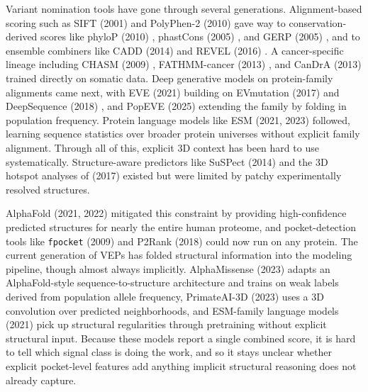 \documentclass{article}
\begin{document}
Variant nomination tools have gone through several generations. Alignment-based scoring such as SIFT (2001) \citep{ng2001sift}
and PolyPhen-2 (2010) \citep{adzhubei2010polyphen2} gave way to
conservation-derived scores like phyloP (2010) \citep{pollard2010phylop},
phastCons (2005) \citep{siepel2005phastcons}, and GERP (2005) \citep{cooper2005gerp},
and to ensemble combiners like CADD (2014) \citep{kircher2014cadd} and REVEL
(2016) \citep{ioannidis2016revel}. A cancer-specific lineage including CHASM
(2009) \citep{carter2009chasm}, FATHMM-cancer (2013) \citep{shihab2013fathmm}, and
CanDrA (2013) \citep{mao2013candra} trained directly on somatic data. Deep
generative models on protein-family alignments came next, with EVE (2021)
\citep{frazer2021eve} building on EVmutation (2017) \citep{hopf2017evmutation}
and DeepSequence (2018) \citep{riesselman2018deepsequence}, and PopEVE
(2025) \citep{orenbuch2025popeve} extending the family by folding in
population frequency. Protein language models like ESM (2021, 2023)
\citep{rives2021esm, lin2022esm2} followed, learning sequence
statistics over broader protein universes without explicit family
alignment. Through all of this, explicit 3D context has been hard to
use systematically. Structure-aware predictors like SuSPect (2014)
\citep{yates2014suspect} and the 3D hotspot analyses of
\citet{gao20173dhotspots} (2017) existed but were limited by patchy
experimentally resolved structures.

AlphaFold (2021, 2022) \citep{jumper2021alphafold, varadi2022alphafolddb} mitigated
this constraint by providing high-confidence predicted structures for
nearly the entire human proteome, and pocket-detection tools like
\texttt{fpocket} (2009) \citep{leguilloux2009fpocket} and P2Rank (2018)
\citep{krivak2018p2rank} could now run on any protein. The current
generation of VEPs has folded structural information into the modeling
pipeline, though almost always implicitly. AlphaMissense (2023)
\citep{cheng2023alphamissense} adapts an AlphaFold-style
sequence-to-structure architecture and trains on weak labels derived
from population allele frequency, PrimateAI-3D (2023)
\citep{gao2023primateai3d} uses a 3D convolution over predicted
neighborhoods, and ESM-family language models (2021) \citep{meier2021esm1v}
pick up structural regularities through pretraining without explicit
structural input. Because these models report a single combined score, it is hard to
tell which signal class is doing the work, and so it stays unclear
whether explicit pocket-level features add anything implicit
structural reasoning does not already capture.
\end{document}
